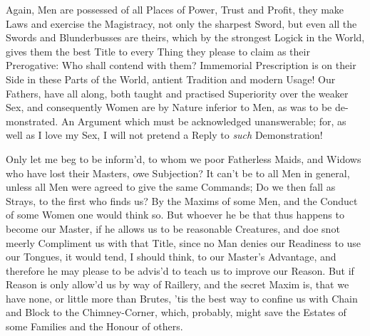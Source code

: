 Again, Men are possessed of all Places of Power, Trust and Profit,
they make Laws and exercise the Magistracy, not only the sharpest
Sword, but even all the Swords and Blunderbusses are theirs, which by
the strongest Logick in the World, gives them the best Title to every
Thing they please to claim as their Prerogative: Who shall contend
with them? Immemorial Prescription is on their Side in these Parts of
the World, antient Tradition and modern Usage! Our Fathers, have all
along, both taught and practised Superiority over the weaker Sex, and
consequently Women are by Nature inferior to Men, as was to be
de-monstrated. An Argument which must be acknowledged
unanswerable; for, as well as I love my Sex, I will not pretend a
Reply to \textit{such} Demonstration!

Only let me beg to be inform'd, to whom we poor Fatherless Maids, and
Widows who have lost their Masters, owe Subjection? It can't be to all
Men in general, unless all Men were agreed to give the same Commands;
Do we then fall as Strays, to the first who finds us? By the Maxims of
some Men, and the Conduct of some Women one would think so. But
whoever he be that thus happens to become our Master, if he allows us
to be reasonable Creatures, and doe snot meerly Compliment us with
that Title, since no Man denies our Readiness to use our Tongues, it
would tend, I should think, to our Master's Advantage, and therefore
he may please to be advis'd to teach us to improve our Reason. But if
Reason is only allow'd us by way of Raillery, and the secret
 Maxim is, that we have none, or little more than Brutes,
'tis the best way to confine us with Chain and Block to the
Chimney-Corner, which, probably, might save the Estates of some
Families and the Honour of others.


